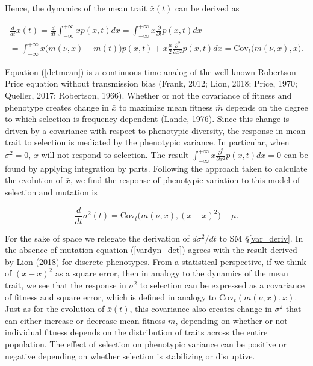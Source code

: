 \documentclass[]{elsarticle} %
\begin{document}
Hence, the dynamics of the mean trait \(\bar x(t)\) can be derived as

\begin{multline}\label{detmean}
\frac{d}{dt}\bar x(t)=\frac{d}{dt}\int_{-\infty}^{+\infty} x p(x,t)dx=\int_{-\infty}^{+\infty} x\frac{\partial}{\partial t} p(x,t)dx \\
=\int_{-\infty}^{+\infty} x\big(m(\nu,x)-\bar m(t)\big) p(x,t)+x\frac{\mu}{2}\frac{\partial^2}{\partial x^2} p(x,t)dx
=\mathrm{Cov}_t\Big(m(\nu,x),x\Big).
\end{multline}

Equation (\ref{detmean}) is a continuous time analog of the well known
Robertson-Price equation without transmission bias (Frank, 2012; Lion,
2018; Price, 1970; Queller, 2017; Robertson, 1966). Whether or not the
covariance of fitness and phenotype creates change in \(\bar x\) to
maximize mean fitness \(\bar m\) depends on the degree to which
selection is frequency dependent (Lande, 1976). Since this change is
driven by a covariance with respect to phenotypic diversity, the
response in mean trait to selection is mediated by the phenotypic
variance. In particular, when \(\sigma^2=0\), \(\bar x\) will not
respond to selection. The result
\(\int_{-\infty}^{+\infty} x\frac{\partial^2}{\partial x^2} p(x,t)dx=0\)
can be found by applying integration by parts. Following the approach
taken to calculate the evolution of \(\bar x\), we find the response of
phenotypic variation to this model of selection and mutation is

\begin{equation}\label{vardyn_det}
\frac{d}{dt}\sigma^2(t)=\mathrm{Cov}_t\Big(m(\nu,x),(x-\bar x)^2\Big)+\mu.
\end{equation}

For the sake of space we relegate the derivation of \(d\sigma^2/dt\) to
SM \S\ref{var_deriv}. In the absence of mutation equation
(\ref{vardyn_det}) agrees with the result derived by Lion (2018) for
discrete phenotypes. From a statistical perspective, if we think of
\((x-\bar x)^2\) as a square error, then in analogy to the dynamics of
the mean trait, we see that the response in \(\sigma^2\) to selection
can be expressed as a covariance of fitness and square error, which is
defined in analogy to \(\mathrm{Cov}_t(m(\nu,x),x)\). Just as for the
evolution of \(\bar x(t)\), this covariance also creates change in
\(\sigma^2\) that can either increase or decrease mean fitness
\(\bar m\), depending on whether or not individual fitness depends on
the distribution of traits across the entire population. The effect of
selection on phenotypic variance can be positive or negative depending
on whether selection is stabilizing or disruptive.
\end{document}
